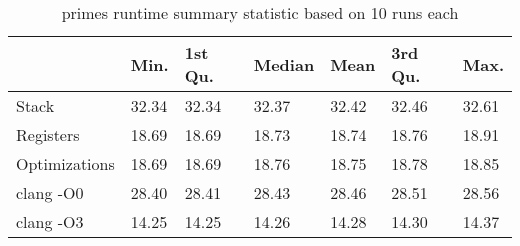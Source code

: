 \begin{table}[h!]
\centering
\begin{tabular}{p{}p{}p{}p{}p{}p{}p{}}
  \hline
 & Min. & 1st Qu. & Median & Mean & 3rd Qu. & Max. \\ 
  \hline
Stack & 32.34 & 32.34 & 32.37 & 32.42 & 32.46 & 32.61 \\ 
  Registers & 18.69 & 18.69 & 18.73 & 18.74 & 18.76 & 18.91 \\ 
  Optimizations & 18.69 & 18.69 & 18.76 & 18.75 & 18.78 & 18.85 \\ 
  clang -O0 & 28.40 & 28.41 & 28.43 & 28.46 & 28.51 & 28.56 \\ 
  clang -O3 & 14.25 & 14.25 & 14.26 & 14.28 & 14.30 & 14.37 \\ 
   \hline
\end{tabular}
\caption{primes runtime summary statistic based on 10 runs each}
\end{table}
